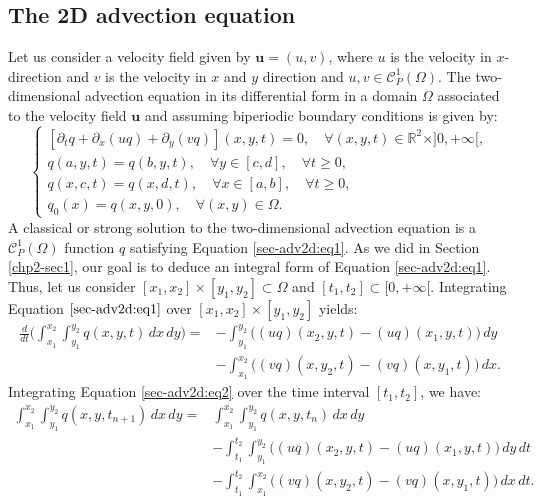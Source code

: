 \subsection{The 2D advection equation}
Let us consider a  velocity field given by $\boldsymbol{u}=(u,v)$, where
$u$ is the velocity in $x$-direction and $v$ is the velocity in $x$ and $y$ direction
and $u,v \in \mathcal{C}^1_P(\Omega)$.
The two-dimensional advection equation in its differential form in 
a domain $\Omega$ associated to the velocity field $\boldsymbol{u}$ 
and assuming biperiodic boundary conditions is given by:
\begin{equation}
	\label{sec-adv2d:eq1}
	\begin{cases}
		[{\partial_t q} + {\partial_x (uq)} +  {\partial_y (vq)}](x, y, t)
		= 0, \quad \forall (x,y,t) \in \mathbb{R}^2\times ]0, +\infty[,\\
		{q}(a, y, t) = {q}(b, y, t), \quad \forall y \in [c,d],  \quad \forall t\geq 0, \\
		{q}(x, c, t) = {q}(x, d, t), \quad \forall x \in [a,b],  \quad \forall t\geq 0, \\
		q_0(x) = q(x,y,0), \quad \forall (x,y) \in \Omega.
	\end{cases}
\end{equation} 
A classical or strong solution to the two-dimensional advection equation is a 
$\mathcal{C}^1_P{(\Omega)}$ function ${q}$ satisfying Equation \eqref{sec-adv2d:eq1}.
As we did in Section \ref{chp2-sec1}, our goal is to deduce an
integral form of Equation \eqref{sec-adv2d:eq1}.
Thus, let us consider  $[x_1,x_2] \times [y_1, y_2]
\subset \Omega$ and $[t_1,t_2] \subset [0, +\infty[$.
Integrating Equation $\eqref{sec-adv2d:eq1}$ over 
$[x_1,x_2] \times [y_1, y_2]$ yields:
\begin{align}
	\label{sec-adv2d:eq2}
	\frac{d}{d t} \bigg(\int_{x_1}^{x_2} \int_{y_1}^{y_2}
	{q}(x, y, t) \,dx \,dy \bigg)=
	&-\int_{y_1}^{y_2} \bigg({(uq)}(x_2, y, t)
	-{(uq)}(x_1, y, t) \bigg) \,dy \\ \nonumber
	&-\int_{x_1}^{x_2} \bigg({(vq)}(x, y_2, t)
	-{(vq)}(x, y_1, t) \bigg) \,dx.
\end{align}
Integrating Equation \eqref{sec-adv2d:eq2} over the time interval $[t_1,t_2]$, 
we have:
\begin{align}
	\label{sec-adv2d:eq3}
	\int_{x_1}^{x_2} \int_{y_1}^{y_2}
	{q}(x, y, t_{n+1}) \,dx \,dy = &\int_{x_1}^{x_2} \int_{y_1}^{y_2}
	{q}(x, y, t_n) \,dx \,dy \\ \nonumber
	&-\int_{t_1}^{t_2} \int_{y_1}^{y_2} \bigg({(uq)}(x_2, y, t)
	-{(uq)}(x_1, y, t) \bigg) \,dy \,dt\\ \nonumber
	&-\int_{t_1}^{t_2} \int_{x_1}^{x_2} \bigg({(vq)}(x, y_2, t)
	-{(vq)}(x, y_1, t) \bigg) \,dx \,dt.
\end{align}
